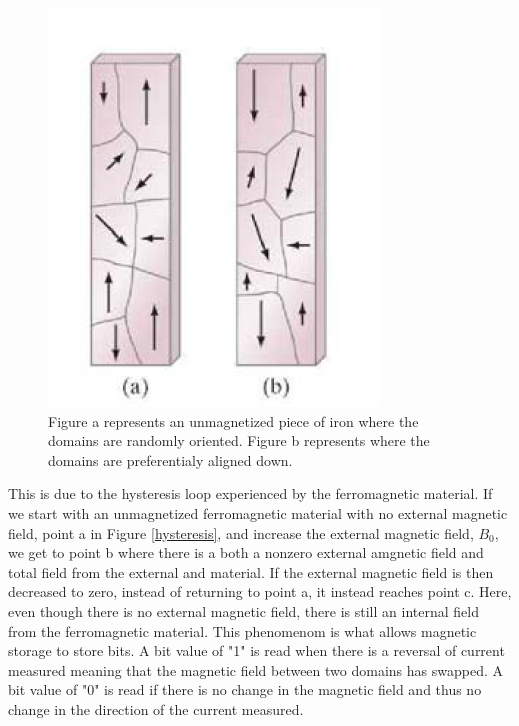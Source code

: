 \documentclass[ notitlepage, numerical, 11pt]{revtex4-1} %
\begin{document}
\begin{figure}[H]
\centerline{\includegraphics[scale=.45]{magneticDomain.png}}
\caption{Figure a represents an unmagnetized piece of iron where the domains are randomly oriented. Figure b represents where the domains are preferentialy aligned down.}
\label{domain}
\end{figure} 
This is due to the hysteresis loop experienced by the ferromagnetic material. If we start with an unmagnetized ferromagnetic material with no external magnetic field, point a in Figure \ref{hysteresis}, and increase the external magnetic field, $B_0$, we get to point b where there is a both a nonzero external amgnetic field and total field from the external and material. If the external magnetic field is then decreased to zero, instead of returning to point a, it instead reaches point c. Here, even though there is no external magnetic field, there is still an internal field from the ferromagnetic material. This phenomenom is what allows magnetic storage to store bits. A bit value of "1" is read when there is a reversal of current measured meaning that the magnetic field between two domains has swapped. A bit value of "0" is read if there is no change in the magnetic field and thus no change in the direction of the current measured.
\end{document}

